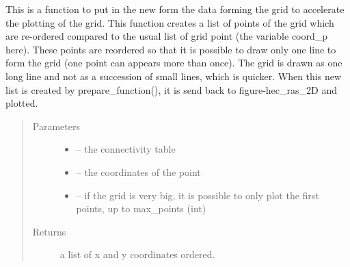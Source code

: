 \documentclass[letterpaper,10pt,english]{sphinxmanual}
\begin{document}
\begin{fulllineitems}
\label{\detokenize{index:src.hec_ras2D.prepare_grid}}
This is a function to put in the new form the data forming the grid to accelerate the plotting of the grid. This function creates
a list of points of the grid which are re-ordered compared to the usual list of grid point (the variable coord\_p
here). These points are reordered so that it is possible to draw only one line to form the grid (one point can
appears more than once). The grid is drawn as one long line and not as a succession of small lines, which is
quicker. When this new list is created by prepare\_function(), it is send back to figure-hec\_ras\_2D and plotted.
\begin{quote}\begin{description}
\item[{Parameters}] \leavevmode\begin{itemize}
\item {} 
 -- the connectivity table

\item {} 
 -- the coordinates of the point

\item {} 
 -- if the grid is very big, it is possible to only plot the first points, up to max\_points (int)

\end{itemize}

\item[{Returns}] \leavevmode
a list of x and y coordinates ordered.

\end{description}\end{quote}

\end{fulllineitems}

\end{document}
